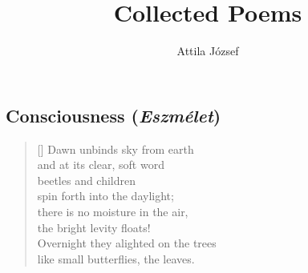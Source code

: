 \documentclass[a4paper,12pt,twoside,final]{book}
\title{Collected Poems}
\author{Attila József}
\begin{document}
\maketitle

\chapter{}
\section{Consciousness (\emph{Eszmélet})}


\settowidth{\versewidth}{Overnight they alighted on the trees}

\begin{verse}[\versewidth]
  Dawn unbinds sky from earth \\
  and at its clear, soft word \\
  beetles and children \\
  spin forth into the daylight; \\
  there is no moisture in the air, \\
  the bright levity floats! \\
  Overnight they alighted on the trees \\
  like small butterflies, the leaves.
\end{verse}

\newpage

\settowidth{\versewidth}{a hajnal s tiszta, lágy szavára}
\end{document}
